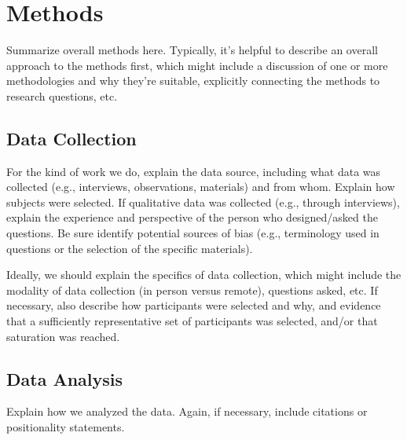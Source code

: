 \section{Methods}\label{sec:methods}

Summarize overall methods here. Typically, it's helpful to describe an overall
approach to the methods first, which might include a discussion of one or more
methodologies and why they're suitable, explicitly connecting the methods to
research questions, etc.

\subsection{Data Collection}\label{sec:methods:collection}

For the kind of work we do, explain the data source, including what data was
collected (e.g., interviews, observations, materials) and from whom. Explain how
subjects were selected. If qualitative data was collected (e.g., through
interviews), explain the experience and perspective of the person who
designed/asked the questions. Be sure identify potential sources of bias (e.g.,
terminology used in questions or the selection of the specific materials).

Ideally, we should explain the specifics of data collection, which might include
the modality of data collection (in person versus remote), questions asked, etc.
If necessary, also describe how participants were selected and why, and evidence
that a sufficiently representative set of participants was selected, and/or that
saturation was reached.

\subsection{Data Analysis}
\label{sec:methods:analysis}

Explain how we analyzed the data. Again, if necessary, include citations or
positionality statements.
